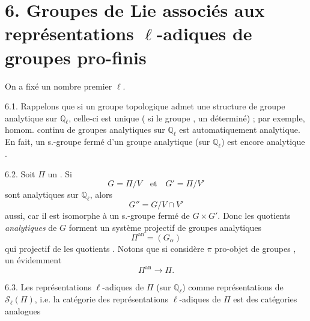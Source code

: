 \documentclass[11pt,a4paper]{article}
\begin{document}

\section{ 6. Groupes  de Lie associés aux représentations $\ell$-adiques de groupes pro-finis}


On a fixé un nombre premier $\ell$.

6.1. Rappelons que si un groupe topologique admet une structure de groupe
analytique sur $\mathbb{Q}_\ell$, celle-ci est  unique
(\ill{} si le groupe \ill{} , \ill{} un \ill{} déterminé) ;
\struck{\ill{}} par exemple,  homom. continu de groupes analytiques
sur $\mathbb{Q}_\ell$ est automatiquement analytique. En fait, un s.-groupe fermé
d'un groupe analytique (sur $\mathbb{Q}_\ell$) est encore analytique
. \ill{}

6.2. Soit $\Pi$ un \ill{} \ill{}. Si
\[
  G = \Pi/V \quad\text{et}\quad G' = \Pi/V'
\]
sont analytiques sur $\mathbb{Q}_\ell$, alors
\[
  G'' = G/V\cap V'
\]
aussi, car il \struck{\ill{}} est isomorphe à un s.-groupe fermé de $G\times G'$.
Donc les \struck{\ill{}} quotients \emph{analytiques} de $G$ forment un
système projectif de groupes analytiques
\[
  \Pi^{\mathrm{an}} = (G_\alpha)
\]
qui  \ill{}  projectif de  les quotients
\ill{}. Notons que si \ill{} considère $\pi$  \struck{\ill{}}
 pro-objet de groupes 
\ill{}, \ill{} un \ill{} évidemment
\[
  \Pi^{\mathrm{an}} \longrightarrow \Pi .
\]

6.3. Les représentations $\ell$-adiques de $\Pi$ (sur $\mathbb{Q}_\ell$)
\ill{}  \ill{}  comme
représentations \struck{\ill{}} de $\mathcal{S}_\ell(\Pi)$,
i.e. la catégorie  des représentations $\ell$-adiques de $\Pi$ est
\struck{\ill{}} \add{$\varinjlim$} des catégories analogues
\end{document}
